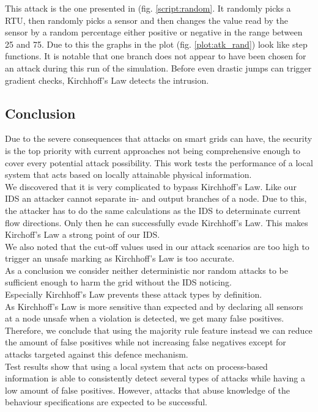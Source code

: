 \documentclass[conference]{IEEEtran}
\begin{document}
			This attack is the one presented in (fig. \ref{script:random}. It randomly picks a RTU, then randomly picks a sensor and then changes the value read by the sensor by a random percentage either positive or negative in the range between 25 and 75. Due to this the graphs in the plot (fig. \ref{plot:atk_rand}) look like step functions. It is notable that one branch does not appear to have been chosen for an attack during this run of the simulation. Before even drastic jumps can trigger gradient checks, Kirchhoff's Law detects the intrusion.
			
		\subsection{Conclusion}

			Due to the severe consequences that attacks on smart grids can have, the security is the top priority with current approaches not being comprehensive enough to cover every potential attack possibility. This work tests the performance of a local system that acts based on locally attainable physical information. \\
			We discovered that it is very complicated to bypass Kirchhoff's Law.
			Like our IDS an attacker cannot separate in- and output branches of a node. Due to this, the attacker has to do the same calculations as the IDS to determinate current flow directions. Only then he can successfully evade Kirchhoff's Law. This makes Kirchoff's Law a strong point of our IDS. \\
			We also noted that the cut-off values used in our attack scenarios are too high to trigger an unsafe marking as Kirchhoff's Law is too accurate.\\
			As a conclusion we consider neither deterministic nor random attacks to be sufficient enough to harm the grid without the IDS noticing.\\
			Especially Kirchhoff's Law prevents these attack types by definition.\\
			As Kirchhoff's Law is more sensitive than expected and by declaring all sensors at a node unsafe when a violation is detected, we get many false positives. Therefore, we conclude that using the majority rule feature instead we can reduce the amount of false positives while not increasing false negatives except for attacks targeted against this defence mechanism. \\
			Test results show that using a local system that acts on process-based information is able to consistently detect several types of attacks while having a low amount of false positives. However, attacks that abuse knowledge of the behaviour specifications are expected to be successful. 
	
\end{document}
